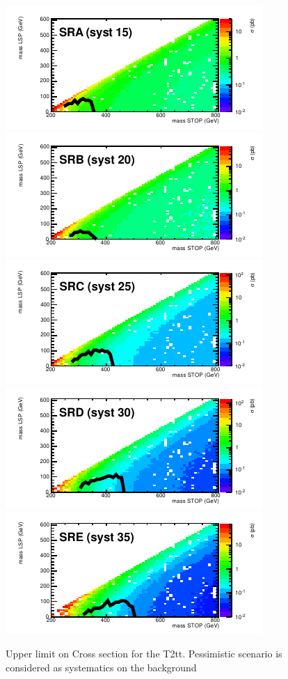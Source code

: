 \begin{figure}[hbt]
  \begin{center}
        \includegraphics[width=0.5\linewidth]{plots/stopPlot/masses_SRA_xsecP.pdf}%
        \includegraphics[width=0.5\linewidth]{plots/stopPlot/masses_SRB_xsecP.pdf}
        \includegraphics[width=0.5\linewidth]{plots/stopPlot/masses_SRC_xsecP.pdf}%
        \includegraphics[width=0.5\linewidth]{plots/stopPlot/masses_SRD_xsecP.pdf}
        \includegraphics[width=0.5\linewidth]{plots/stopPlot/masses_SRE_xsecP.pdf}%
    \caption{Upper limit on Cross section for the T2tt. Pessimistic scenario is considered as systematics on the background}
\label{fig:SigEff}
      \end{center}
\end{figure}


